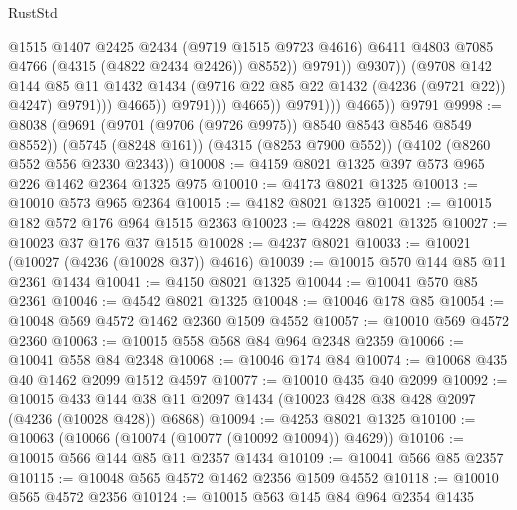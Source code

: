 \begin{lexlean}{RustStd}
\begin{coremodule}
                                            @1515
                                            @1407
                                            @2425
                                            @2434
                                            (@9719 @1515 @9723 @4616)
                                            @6411
                                            @4803
                                            @7085
                                            @4766
                                            (@4315 (@4822 @2434 @2426))
                                            @8552))
                                        @9791))
                                    @9307))
                                (@9708
                                  @142
                                  @144
                                  @85
                                  @11
                                  @1432
                                  @1434
                                  (@9716 @22 @85 @22 @1432 (@4236 (@9721 @22)) @4247)
                                  @9791)))
                            @4665))
                        @9791)))
                  @4665))
              @9791)))
        @4665))
    @9791
@9998 := @8038
    (@9691 (@9701 (@9706 (@9726 @9975)) @8540 @8543 @8546 @8549 @8552))
    (@5745 (@8248 @161))
    (@4315 (@8253 @7900 @552))
    (@4102 (@8260 @552 @556 @2330 @2343))
@10008 := @4159 @8021 @1325 @397 @573 @965 @226 @1462 @2364 @1325 @975
@10010 := @4173 @8021 @1325
@10013 := @10010 @573 @965 @2364
@10015 := @4182 @8021 @1325
@10021 := @10015 @182 @572 @176 @964 @1515 @2363
@10023 := @4228 @8021 @1325
@10027 := @10023 @37 @176 @37 @1515
@10028 := @4237 @8021
@10033 := @10021 (@10027 (@4236 (@10028 @37)) @4616)
@10039 := @10015 @570 @144 @85 @11 @2361 @1434
@10041 := @4150 @8021 @1325
@10044 := @10041 @570 @85 @2361
@10046 := @4542 @8021 @1325
@10048 := @10046 @178 @85
@10054 := @10048 @569 @4572 @1462 @2360 @1509 @4552
@10057 := @10010 @569 @4572 @2360
@10063 := @10015 @558 @568 @84 @964 @2348 @2359
@10066 := @10041 @558 @84 @2348
@10068 := @10046 @174 @84
@10074 := @10068 @435 @40 @1462 @2099 @1512 @4597
@10077 := @10010 @435 @40 @2099
@10092 := @10015
    @433
    @144
    @38
    @11
    @2097
    @1434
    (@10023 @428 @38 @428 @2097 (@4236 (@10028 @428)) @6868)
@10094 := @4253 @8021 @1325
@10100 := @10063 (@10066 (@10074 (@10077 (@10092 @10094)) @4629))
@10106 := @10015 @566 @144 @85 @11 @2357 @1434
@10109 := @10041 @566 @85 @2357
@10115 := @10048 @565 @4572 @1462 @2356 @1509 @4552
@10118 := @10010 @565 @4572 @2356
@10124 := @10015 @563 @145 @84 @964 @2354 @1435

\end{coremodule}
\end{lexlean}
